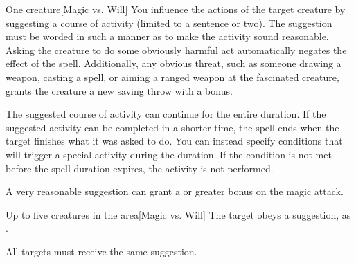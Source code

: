 \begin{spellheader}
    \spellrng{\rngclose}
\end{spellheader}
\begin{spelleffects}
    \begin{spelltarget}{One creature}[Magic vs. Will]
        \spelleffect You influence the actions of the target creature by suggesting a course of activity (limited to a sentence or two). The suggestion must be worded in such a manner as to make the activity sound reasonable. Asking the creature to do some obviously harmful act automatically negates the effect of the spell. Additionally, any obvious threat, such as someone drawing a weapon, casting a spell, or aiming a ranged weapon at the fascinated creature, grants the creature a new saving throw with a  bonus.
        \par The suggested course of activity can continue for the entire duration. If the suggested activity can be completed in a shorter time, the spell ends when the target finishes what it was asked to do. You can instead specify conditions that will trigger a special activity during the duration. If the condition is not met before the spell duration expires, the activity is not performed.
    \end{spelltarget}
\end{spelleffects}
\begin{spellfooter}
    \spellnotes A very reasonable suggestion can grant a  or greater bonus on the magic attack.

    \norepeatspellnotes
\end{spellfooter}

\begin{spellheader}
    \spelldur{\durmed}
\end{spellheader}
\begin{spelleffects}
    \begin{spelltargets}{Up to five creatures in the area}[Magic vs. Will]
        \spelleffect The target obeys a suggestion, as .
    \end{spelltargets}
\end{spelleffects}
\begin{spellfooter}
    \spellnotes All targets must receive the same suggestion.
\end{spellfooter}

